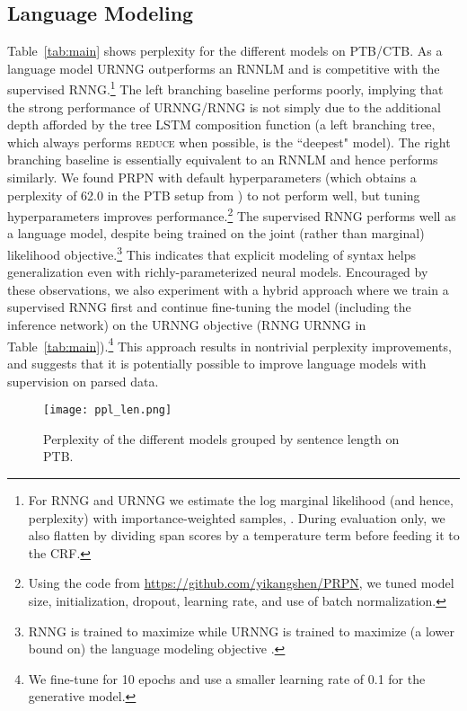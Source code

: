 \documentclass[11pt,a4paper]{article}
\begin{document}
\subsection{Language Modeling}
\vspace{-1mm}
Table~\ref{tab:main} shows perplexity for the different models on PTB/CTB.
As a language model URNNG outperforms an RNNLM and is competitive with the supervised RNNG.\footnote{For RNNG and URNNG we estimate the log marginal likelihood (and hence, perplexity) with  importance-weighted samples,
. During evaluation only, we also flatten  by dividing span scores  by a temperature term  before feeding it to the CRF.}
The left branching baseline performs poorly, implying that the strong performance of URNNG/RNNG is not simply due to the additional depth afforded by the tree LSTM composition function (a left branching tree, which always performs \textsc{reduce} when possible, is the ``deepest" model). The right branching baseline is essentially equivalent to an RNNLM and hence performs similarly. We found PRPN with default hyperparameters (which obtains a perplexity of 62.0 in the PTB setup from \citet{Mikolov2010}) to not perform well, but tuning hyperparameters improves performance.\footnote{Using the code from \url{https://github.com/yikangshen/PRPN}, we tuned model size, initialization, dropout, learning rate, and use of batch normalization.}
The supervised RNNG performs well as a language model, despite being trained on the joint (rather than marginal) likelihood objective.\footnote{RNNG is trained to maximize  while URNNG is trained to maximize (a lower bound on) the  language modeling objective .} This indicates that explicit modeling of syntax helps generalization even with richly-parameterized neural models.
Encouraged by these observations, we also experiment with a hybrid approach where we train a supervised RNNG first and continue fine-tuning the model (including the inference network)
on the URNNG objective (RNNG  URNNG in Table~\ref{tab:main}).\footnote{We fine-tune for 10 epochs and use a smaller learning rate of 0.1 for the generative model.} This approach results in nontrivial perplexity improvements, and suggests that it is potentially possible to improve language models with supervision on parsed data.
\begin{figure}[t]
    \centering
    \texttt{[image: ppl\_len.png]}
        \vspace{-5mm}
    \caption{Perplexity of the different  models grouped by sentence length on PTB.}
           \vspace{-2mm}
    \label{fig:len}
\end{figure}
\end{document}
